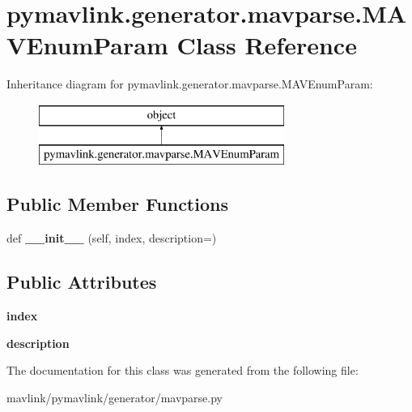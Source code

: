 \hypertarget{classpymavlink_1_1generator_1_1mavparse_1_1MAVEnumParam}{}\section{pymavlink.\+generator.\+mavparse.\+M\+A\+V\+Enum\+Param Class Reference}
\label{classpymavlink_1_1generator_1_1mavparse_1_1MAVEnumParam}
Inheritance diagram for pymavlink.\+generator.\+mavparse.\+M\+A\+V\+Enum\+Param\+:\begin{figure}[H]
\begin{center}
\leavevmode
\includegraphics[height=2.000000cm]{classpymavlink_1_1generator_1_1mavparse_1_1MAVEnumParam}
\end{center}
\end{figure}
\subsection*{Public Member Functions}
\begin{DoxyCompactItemize}
\item 
\mbox{\label{classpymavlink_1_1generator_1_1mavparse_1_1MAVEnumParam_ac3a735f2ba9331912edbb1cf561a0825}} 
def {\bfseries \+\_\+\+\_\+init\+\_\+\+\_\+} (self, index, description=\textquotesingle{}\textquotesingle{})
\end{DoxyCompactItemize}
\subsection*{Public Attributes}
\begin{DoxyCompactItemize}
\item 
\mbox{\label{classpymavlink_1_1generator_1_1mavparse_1_1MAVEnumParam_aa2db535fa7a3fd9f682b56a65cf09e9e}} 
{\bfseries index}
\item 
\mbox{\label{classpymavlink_1_1generator_1_1mavparse_1_1MAVEnumParam_a0a2a311f9a7f965600b077e7ba3a3e1e}} 
{\bfseries description}
\end{DoxyCompactItemize}


The documentation for this class was generated from the following file\+:\begin{DoxyCompactItemize}
\item 
mavlink/pymavlink/generator/mavparse.\+py\end{DoxyCompactItemize}
